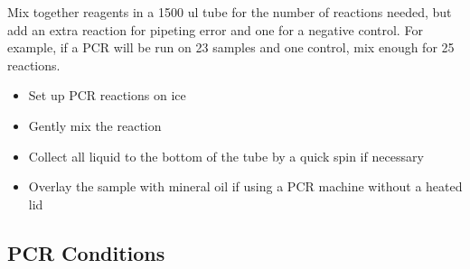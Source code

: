 \documentclass[
  letterpaper,
  DIV=11,
  numbers=noendperiod]{scrreprt}
\providecommand{\tightlist}{%
  \setlength{\itemsep}{0pt}\setlength{\parskip}{0pt}}\usepackage{longtable,booktabs,array}
\begin{document}
Mix together reagents in a 1500 ul tube for the number of reactions
needed, but add an extra reaction for pipeting error and one for a
negative control. For example, if a PCR will be run on 23 samples and
one control, mix enough for 25 reactions.

\begin{tcolorbox}[enhanced jigsaw, bottomtitle=1mm, rightrule=.15mm, toptitle=1mm, opacitybacktitle=0.6, bottomrule=.15mm, titlerule=0mm, coltitle=black, leftrule=.75mm, arc=.35mm, colback=white, colframe=quarto-callout-warning-color-frame, left=2mm, colbacktitle=quarto-callout-warning-color!10!white, title=\textcolor{quarto-callout-warning-color}{\faExclamationTriangle}\hspace{0.5em}{Keep reactions cold}, toprule=.15mm, opacityback=0, breakable]

\begin{itemize}
\tightlist
\item
  Set up PCR reactions on ice
\item
  Gently mix the reaction
\item
  Collect all liquid to the bottom of the tube by a quick spin if
  necessary
\item
  Overlay the sample with mineral oil if using a PCR machine without a
  heated lid
\end{itemize}

\end{tcolorbox}

\hypertarget{pcr-conditions}{%
\subsection{PCR Conditions}\label{pcr-conditions}}
\end{document}
